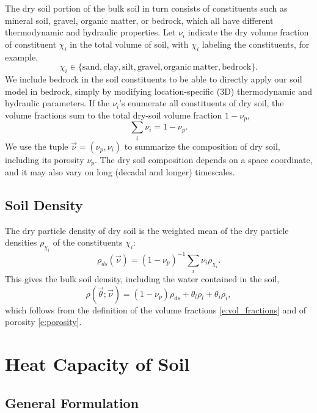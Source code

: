 \documentclass[twoside,10pt]{report}
\begin{document}
The dry soil portion of the bulk soil in turn consists of constituents such as mineral soil, gravel, organic matter, or bedrock, which all have different thermodynamic and hydraulic properties.  Let $\nu_{i}$ indicate the dry volume fraction of constituent $\chi_i$ in the total volume of soil, with $\chi_i$ labeling the constituents, for example,
\[
\chi_i \in \{ {\mathrm{sand}}, {\mathrm{clay}}, {\mathrm{silt}}, {\mathrm{gravel}}, \mathrm{organic~matter}, {\mathrm{bedrock}} \}.
\]
We include bedrock in the soil constituents to be able to directly apply our soil model in bedrock, simply by modifying location-specific (3D) thermodynamic and hydraulic parameters. If the $\nu_i$'s enumerate all constituents of dry soil, the volume fractions sum to the total dry-soil volume fraction $1-\nu_p$,
\[
\sum_i \nu_{i} = 1-\nu_p.
\] 
We use the tuple $\vec{\nu} = (\nu_p, \nu_i)$ to summarize the composition of dry soil, including its porosity $\nu_p$. The dry soil composition depends on a space coordinate, and it may also vary on long (decadal and longer) timescales.

\subsection{Soil Density}

The dry particle density of dry soil is the weighted mean of the dry particle densities $\rho_{\chi_i}$ of the constituents $\chi_i$:
\begin{equation}\label{d:dry_soil_density}
    \rho_{ds}(\vec{\nu})  = (1-\nu_p)^{-1} \sum_i \nu_{i} {\rho}_{\chi_i}.
\end{equation}
This gives the bulk soil density, including the water contained in the soil,  
\begin{equation}\label{e:bulk_density}
\rho (\vec{\theta}; \vec{\nu}) = (1-\nu_p) \rho_{ds} + \theta_l \rho_l + \theta_i \rho_i,
\end{equation}
which follows from the definition of the volume fractions \eqref{e:vol_fractions} and of porosity \eqref{e:porosity}. 

\section{Heat Capacity of Soil}

\subsection{General Formulation}
\end{document}
